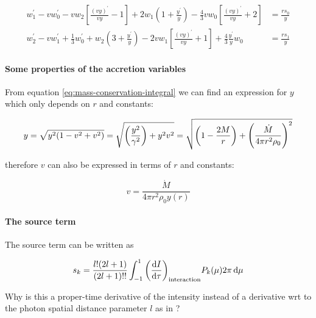 \documentclass[main.tex]{subfiles}
\begin{document}
\begin{subequations} \label{eq:NTZ91-moment-equations-logarithmic}
    \begin{align}
        w_{1}^{\prime}-v w_{0}^{\prime}
        -v w_{2}\left[\frac{(v y)^{\prime}}{v y}-1\right]
        +2 w_{1}\left(1+\frac{y^{\prime}}{y}\right)
        -\frac{4}{3} v w_{0}\left[\frac{(v y)^{\prime}}{v y}+2\right]&=\frac{r s_{0}}{y} \\
        w_{2}^{\prime}-v w_{1}^{\prime}+\frac{1}{3} w_{0}^{\prime} +w_{2}\left(3+\frac{y^{\prime}}{y}\right)-2 v w_{1}\left[\frac{(v y)^{\prime}}{v y}+1\right]+\frac{4}{3} \frac{y^{\prime}}{y} w_{0} &=\frac{r s_{1}}{y}
    \end{align}
\end{subequations}

\paragraph{Some properties of the accretion variables}

From equation \eqref{eq:mass-conservation-integral} we can find an expression \cite[eq. 18a]{ThorneFLammmangZytkow:1981feb} for \(y\) which only depends on \(r\) and constants:

\begin{equation}
  y = \sqrt{y^2 \qty(1 - v^2 + v^2)}
  = \sqrt{\qty(\frac{y^2}{\gamma^2}) + y^2 v^2}
  = \sqrt{\qty(1 - \frac{2M}{r}) + \qty(\frac{\dot{M}}{4 \pi r^2 \rho_0})^2}
\end{equation}

therefore \(v\) can also be expressed in terms of \(r\) and constants:

\begin{equation}
  v = \frac{\dot M}{4 \pi r^2 \rho_0 y(r)}
\end{equation}

\paragraph{The source term}

The source term can be written \cite[eq. 15]{ThorneFLammmangZytkow:1981feb} as

\begin{equation} \label{eq:source-term}
  s_k = \frac{l! (2l+1)}{(2l+1)!!} \int_{-1}^1 \qty(\dv{I}{\tau})_{\text{interaction}} P_k(\mu) 2 \pi \dd{\mu}
\end{equation}

\begin{greenbox}
  Why is this a proper-time derivative of the intensity instead of a derivative wrt to the photon spatial distance parameter \(l\) as in \cite[]{Thorne:1981feb}?
\end{greenbox}
\end{document}
